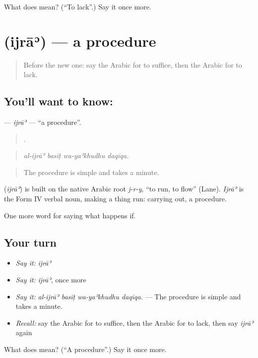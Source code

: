 \begin{tcolorbox}[breakable,colback=teal!4,colframe=teal!35!black,title={Before you move on}]
What does  mean? (\textquotedblleft{}To lack\textquotedblright{}.) Say it once more.
\end{tcolorbox}
\section[\texorpdfstring{\ar{إجراء} (ijrāʾ)}{إجراء (ijrāʾ)}]{ (ijrāʾ) — a procedure}

\label{lesson:AR-C406-ijra}



\begin{quote}
Before the new one: say the Arabic for to suffice, then the Arabic for to lack.
\end{quote}

\subsection*{You'll want to know: }
\textbf{} — \emph{ijrāʾ} — \textquotedblleft{}a procedure\textquotedblright{}.

\begin{quote}
   .
\end{quote}

\begin{quote}
\emph{al-ijrāʾ basīṭ wa-yaʾkhudhu daqīqa.}
\end{quote}

\begin{quote}
The procedure is simple and takes a minute.
\end{quote}

\begin{cousinweb}
\textbf{} (\emph{ijrāʾ}) is built on the native Arabic root \emph{j-r-y}, \textquotedblleft{}to run, to flow\textquotedblright{} (Lane). \emph{Ijrāʾ} is the Form IV verbal noun, making a thing run: carrying out, a procedure.
\end{cousinweb}

\begin{grammarlens}[title={What you've built}]
One more word for saying what happens if.
\end{grammarlens}

\subsection*{Your turn}
\begin{itemize}
\raggedright
  \item \emph{Say it:} \emph{ijrāʾ}
  \item \emph{Say it:} \emph{ijrāʾ}, once more
  \item \emph{Say it:} \emph{al-ijrāʾ basīṭ wa-yaʾkhudhu daqīqa.} — The procedure is simple and takes a minute.
  \item \emph{Recall:} say the Arabic for to suffice, then the Arabic for to lack, then say \emph{ijrāʾ} again
\end{itemize}

\begin{tcolorbox}[breakable,colback=teal!4,colframe=teal!35!black,title={Before you move on}]
What does  mean? (\textquotedblleft{}A procedure\textquotedblright{}.) Say it once more.
\end{tcolorbox}
